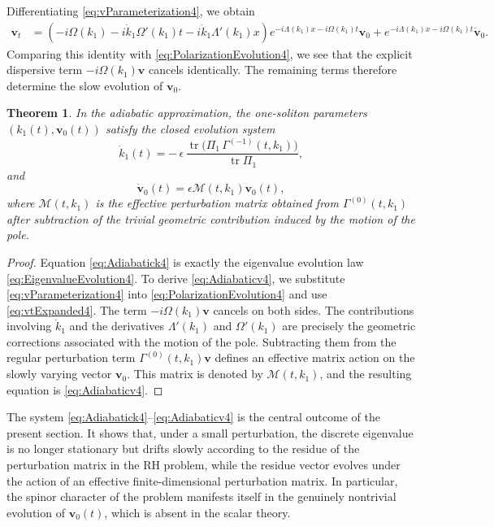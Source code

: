 \documentclass[11pt]{amsart}
\newtheorem{theorem}{Theorem}[section]
\theoremstyle{definition}
\numberwithin{equation}{section}
\begin{document}
Differentiating \eqref{eq:vParameterization4}, we obtain
\begin{align}
\mathbf{v}_t
&=
\left(-i\Omega(k_1)-i\dot{k}_1 \Omega'(k_1)t - i\dot{k}_1 \Lambda'(k_1)x\right)e^{-i\Lambda(k_1)x-i\Omega(k_1)t}\mathbf{v}_0
+
e^{-i\Lambda(k_1)x-i\Omega(k_1)t}\dot{\mathbf{v}}_0.
\label{eq:vtExpanded4}
\end{align}
Comparing this identity with \eqref{eq:PolarizationEvolution4}, we see that the explicit dispersive term $-i\Omega(k_1)\mathbf{v}$ cancels identically. The remaining terms therefore determine the slow evolution of $\mathbf{v}_0$.

\begin{theorem}
\label{thm_5_1}
In the adiabatic approximation, the one-soliton parameters $(k_1(t),\mathbf{v}_0(t))$ satisfy the closed evolution system
\begin{equation}
\dot{k}_1(t) = -\,\epsilon\,\frac{\operatorname{tr}\bigl(\Pi_1\,\Gamma^{(-1)}(t,k_1)\bigr)}{\operatorname{tr}\Pi_1},
\label{eq:Adiabatick4}
\end{equation}
and
\begin{equation}
\dot{\mathbf{v}}_0(t)=\epsilon \mathcal{M}(t,k_1)\mathbf{v}_0(t),
\label{eq:Adiabaticv4}
\end{equation}
where $\mathcal{M}(t,k_1)$ is the effective perturbation matrix obtained from $\Gamma^{(0)}(t,k_1)$ after subtraction of the trivial geometric contribution induced by the motion of the pole.
\end{theorem}

\begin{proof}
Equation \eqref{eq:Adiabatick4} is exactly the eigenvalue evolution law \eqref{eq:EigenvalueEvolution4}. To derive \eqref{eq:Adiabaticv4}, we substitute \eqref{eq:vParameterization4} into \eqref{eq:PolarizationEvolution4} and use \eqref{eq:vtExpanded4}. The term $-i\Omega(k_1)\mathbf{v}$ cancels on both sides. The contributions involving $\dot{k}_1$ and the derivatives $\Lambda'(k_1)$ and $\Omega'(k_1)$ are precisely the geometric corrections associated with the motion of the pole. Subtracting them from the regular perturbation term $\Gamma^{(0)}(t,k_1)\mathbf{v}$ defines an effective matrix action on the slowly varying vector $\mathbf{v}_0$. This matrix is denoted by $\mathcal M(t,k_1)$, and the resulting equation is \eqref{eq:Adiabaticv4}.
\end{proof}

The system \eqref{eq:Adiabatick4}--\eqref{eq:Adiabaticv4} is the central outcome of the present section. It shows that, under a small perturbation, the discrete eigenvalue is no longer stationary but drifts slowly according to the residue of the perturbation matrix in the RH problem, while the residue vector evolves under the action of an effective finite-dimensional perturbation matrix. In particular, the spinor character of the problem manifests itself in the genuinely nontrivial evolution of $\mathbf{v}_0(t)$, which is absent in the scalar theory.
\end{document}
